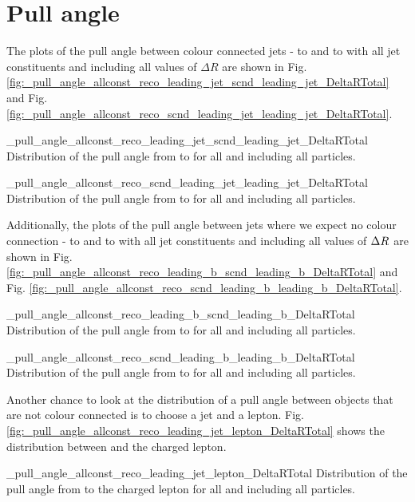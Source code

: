 \section{Pull angle}

The plots of the pull angle between colour connected jets - \leadingjet to \scndleadingjet and \scndleadingjet to \leadingjet with all jet constituents and including all values of $\Delta R$ are shown in Fig. \ref{fig:_pull_angle_allconst_reco_leading_jet_scnd_leading_jet_DeltaRTotal} and Fig. \ref{fig:_pull_angle_allconst_reco_scnd_leading_jet_leading_jet_DeltaRTotal}.

          {_pull_angle_allconst_reco_leading_jet_scnd_leading_jet_DeltaRTotal}
          {Distribution of the pull angle from \leadingjet to \scndleadingjet for all \DeltaR and including all particles.}

          {_pull_angle_allconst_reco_scnd_leading_jet_leading_jet_DeltaRTotal}
          {Distribution of the pull angle from \scndleadingjet to \leadingjet for all \DeltaR and including all particles.}

Additionally, the plots of the pull angle between jets where we expect no colour connection - \leadingb to \scndleadingb and \scndleadingb to \leadingb with all jet constituents and including all values of $\Delta R^{} $ are shown in Fig. \ref{fig:_pull_angle_allconst_reco_leading_b_scnd_leading_b_DeltaRTotal} and Fig. \ref{fig:_pull_angle_allconst_reco_scnd_leading_b_leading_b_DeltaRTotal}.

          {_pull_angle_allconst_reco_leading_b_scnd_leading_b_DeltaRTotal}
          {Distribution of the pull angle from \leadingb to \scndleadingb for all \DeltaR and including all particles.}

          {_pull_angle_allconst_reco_scnd_leading_b_leading_b_DeltaRTotal}
          {Distribution of the pull angle from \scndleadingb to \leadingb for all \DeltaR and including all particles.}


Another chance to look at the distribution of a pull angle between objects that are not colour connected is to choose a jet and a lepton. Fig. \ref{fig:_pull_angle_allconst_reco_leading_jet_lepton_DeltaRTotal} shows the distribution between \leadingjet and the charged lepton. 

          {_pull_angle_allconst_reco_leading_jet_lepton_DeltaRTotal}
          {Distribution of the pull angle from \leadingjet to the charged lepton for all \DeltaR and including all particles.}


